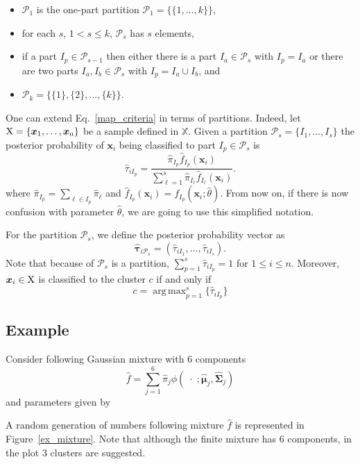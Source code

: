 \documentclass[10pt, a4paper]{article}
\DeclareMathOperator*{\argmax}{arg\,max}
\newcommand{\m}[1]{\boldsymbol{#1}}
\begin{document}
\begin{spacing}{1.9}
\begin{itemize}
\item $\mathcal{P}_1$ is the one-part partition $\mathcal{P}_1 = \{ \{1, \dots, k\} \}$,
\item for each $s$, $1 <  s \leq k$, $\mathcal{P}_{s}$ has $s$ elements,
\item if a part $I_p \in \mathcal{P}_{s-1}$ then either there is a part $I_a \in \mathcal{P}_{s}$ with $I_p = I_a$ or there are two parts $I_a, I_b \in \mathcal{P}_s$ with $I_p = I_a \cup I_b$, and
\item $\mathcal{P}_k= \{ \{1\},\{2\}, \dots, \{k\} \}$.
\end{itemize}



One can extend Eq.~\ref{map_criteria} in terms of partitions. Indeed, let $\rm X = \{\m x_1,\dots, \m x_n\}$ be a sample defined in $\mathbb{X}$. Given a partition $\mathcal{P}_s = \{ I_1, \dots, I_s \}$ the posterior probability of $\m x_i$ being classified to part $I_p\in \mathcal{P}_{s}$ is
\[
\hat{\tau}_{i I_p} =  \frac{ \hat{\pi}_{I_p} \hat{f}_{I_p}(\m x_i) }{\sum_{\ell=1}^s \hat{\pi}_{I_\ell} \hat{f}_{I_\ell}(\m x_i)}.
\]
where $\hat{\pi}_{I_p} = \sum_{\ell \in I_p} \hat{\pi}_\ell$ and $\hat{f}_{I_p}(\m x_i) = f_{I_p}(\m x_i; \hat{\theta})$. From now on, if there is now confusion with parameter $\hat{\theta}$, we are going to use this simplified notation. 

For the partition  $\mathcal{P}_s$, we define the posterior probability vector as
\[
\hat{\m\tau}_{i \mathcal{P}_s} = \left( \hat{\tau}_{i I_1} , \dots, \hat{\tau}_{i I_s}  \right).
\]
Note that because of $\mathcal{P}_s$ is a partition, $\sum_{p=1}^s \hat{\tau}_{i I_p} = 1$ for $1 \leq i \leq n$.
Moreover, $\m x_i \in \rm X$ is classified to the cluster $c$ if and only if
\begin{equation}\label{cluster_criteria}
c= \argmax_{p=1}^s \{ \hat{\tau}_{i I_p} \}
\end{equation}

\subsection{Example}

Consider following Gaussian mixture with 6 components
\[
\hat{f} = \sum_{j=1}^6 \hat{\pi}_j \phi(\;\cdot\; ; \hat{\m\mu}_j, \hat{\m\Sigma}_j)
\]
and parameters given by
{\small  }


A random generation of numbers following mixture $\hat{f}$ is represented in Figure~\ref{ex_mixture}. Note that although the finite mixture has 6 components, in the plot 3 clusters are suggested.



\end{spacing}
\end{document}
